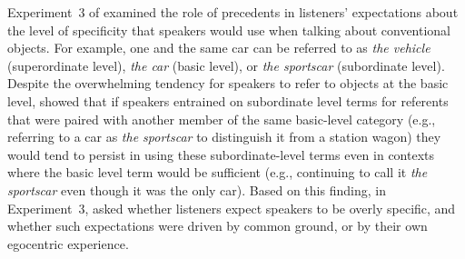 \documentclass[doc,fignum,apacite,floatsintext]{apa6}
\begin{document}
Experiment~3 of  examined the role of precedents in listeners' expectations about the level of specificity that speakers would use when talking about conventional objects.  For example, one and the same car can be referred to as \textit{the vehicle} (superordinate level), \textit{the car} (basic level), or \textit{the sportscar} (subordinate level).  Despite the overwhelming tendency for speakers to refer to objects at the basic level,  showed that if speakers entrained on subordinate level terms for referents that were paired with another member of the same basic-level category (e.g., referring to a car as \textit{the sportscar} to distinguish it from a station wagon) they would tend to persist in using these subordinate-level terms even in contexts where the basic level term would be sufficient (e.g., continuing to call it \textit{the sportscar} even though it was the only car).  Based on this finding, in Experiment~3,  asked whether listeners expect speakers to be overly specific, and whether such expectations were driven by common ground, or by their own egocentric experience.  
\end{document}
